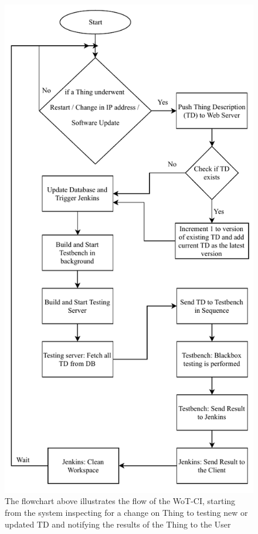 \documentclass[conference]{IEEEtran}
\theoremstyle{definition}
\begin{document}
\begin{figure}[t]
  \centerline{\includegraphics[scale=0.9]{SystemFlowChart} }
  
  \caption{The flowchart above illustrates the flow of the WoT-CI, starting from the system inspecting for a change on Thing to testing new or updated TD and notifying the results of the Thing to the User}
  \label{fig:Algorithm}
\end{figure}
\end{document}
